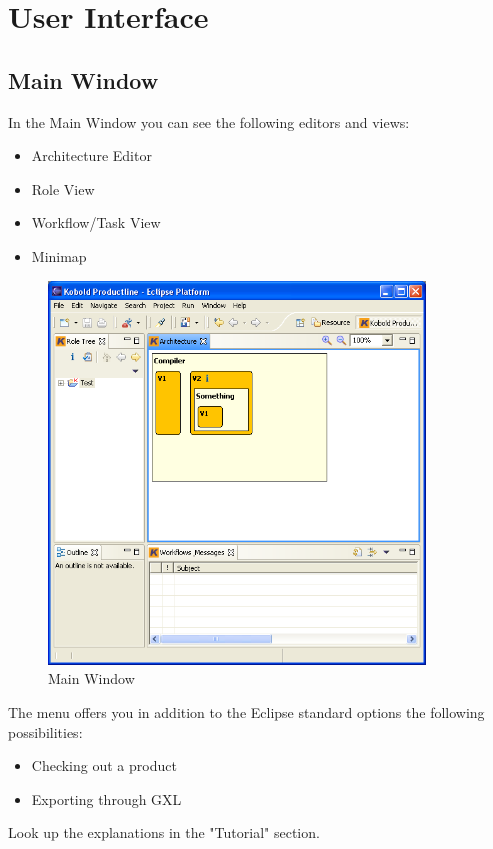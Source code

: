 \chapter{User Interface}

\section{Main Window}
In the Main Window you can see the following editors and views:
\begin{itemize}
	\item Architecture Editor
	\item Role View
	\item Workflow/Task View
	\item Minimap
\end{itemize}

\begin{figure}[h!]
\begin{center}
\includegraphics[width=10cm]{main.png}
   \caption{Main Window}
\label{wizard3}
\end{center}
\end{figure}\par

The menu offers you in addition to the Eclipse standard options the following
possibilities:
\begin{itemize}
	\item Checking out a product
	\item Exporting through GXL
\end{itemize}
Look up the explanations in the "Tutorial" section.

